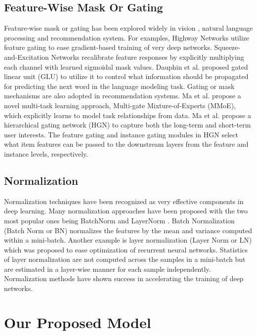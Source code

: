 \documentclass[sigconf]{acmart}
\begin{document}
\subsection{Feature-Wise Mask Or Gating}
Feature-wise mask or gating  has been explored widely in vision \cite{hu2018squeeze,srivastava2015highway}, natural language processing \cite{dauphin2017language} and recommendation system\cite{ma2018modeling,ma2019hierarchical}. For examples, Highway Networks \cite{srivastava2015highway} utilize feature gating to ease gradient-based training of very deep networks. Squeeze-and-Excitation Networks\cite{hu2018squeeze} recalibrate feature responses by explicitly multiplying each channel with learned sigmoidal mask values. Dauphin et al.\cite{dauphin2017language} proposed gated linear unit (GLU) to utilize it to control what information should be propagated for predicting the next word in the language modeling task. Gating or mask mechanisms are also adopted in  recommendation systems. Ma et al. \cite{ma2018modeling} propose a novel multi-task learning approach, Multi-gate Mixture-of-Experts (MMoE), which explicitly learns to model task relationships from data. Ma et al.\cite{ma2019hierarchical} propose a hierarchical gating network (HGN) to capture both the long-term and short-term user interests. The feature gating and instance gating modules in HGN  select what item features can be passed to the downstream layers from the feature and instance levels, respectively.


\subsection{Normalization}
Normalization techniques have been recognized as very effective components in deep learning. Many normalization approaches have been proposed with the two most popular ones being BatchNorm \cite{ioffe2015batch} and LayerNorm \cite{ba2016layer} . Batch Normalization (Batch Norm or BN)\cite{ioffe2015batch} normalizes the features by the mean and variance computed within a mini-batch. Another example is layer normalization (Layer Norm or LN)\cite{ba2016layer} which was proposed to ease optimization of recurrent neural networks. Statistics of layer normalization are not computed across the  samples in a mini-batch but are estimated in a layer-wise manner for each sample independently. Normalization methods have shown success in accelerating the training of deep networks.


\section{Our Proposed Model}
\end{document}
